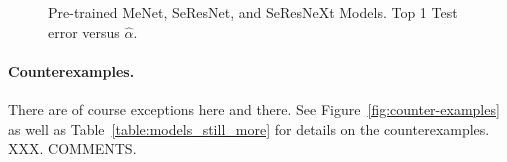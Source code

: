 {\begin{figure}[!htb]
{      \label{fig:shufflenet-small}
   }
   \caption{
      Pre-trained 
      MeNet, SeResNet, and SeResNeXt
      Models.
      Top 1 Test error versus
      $\hat{\alpha}$.
           }
   \label{fig:still_more_2}
\end{figure}


\paragraph{Counterexamples.}
There are of course exceptions here and there.
See
Figure~\ref{fig:counter-examples}
as well as 
Table~\ref{table:models_still_more}
for details on the counterexamples.
XXX.  COMMENTS.

}
